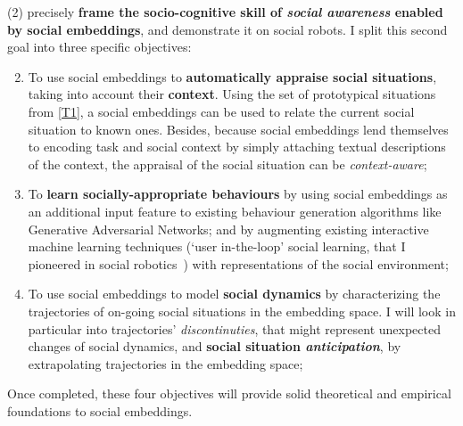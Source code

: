 \vspace{1em}
\noindent(2) precisely \textbf{frame the socio-cognitive skill of \emph{social awareness} enabled
by social embeddings}, and demonstrate it on social robots. I split this second
goal into three specific objectives:



\begin{enumerate}[label=\textbf{O\arabic*}]
    \setcounter{enumi}{1}
    \item \label{T5} To use social embeddings to \textbf{automatically appraise
        social situations}, taking into account their \textbf{context}. Using
        the set of prototypical situations from \ref{T1}, a social embeddings
        can be used to relate the current social situation to known ones.
        Besides, because social embeddings lend themselves to encoding task and
        social context by simply attaching textual descriptions of the context,
        the appraisal of the social situation can be \emph{context-aware};


    \item \label{T4} To \textbf{learn socially-appropriate behaviours} by using
        social embeddings as an additional input feature to existing behaviour
        generation algorithms like Generative Adversarial
        Networks; and by augmenting existing interactive machine
        learning techniques (`user in-the-loop' social learning, that I
        pioneered in social robotics~\cite{senft2017supervised,
        winkle2020couch,winkle2021leador}) with representations of the social
        environment;

    \item \label{T2} To use social embeddings to model \textbf{social dynamics}
        by characterizing the trajectories of on-going social situations in the
        embedding space. I will look in particular into trajectories'
        \emph{discontinuties}, that might represent unexpected changes of social
        dynamics, and \textbf{social situation \emph{anticipation}}, by
        extrapolating trajectories in the embedding space;

\end{enumerate}

Once completed, these four objectives will provide solid theoretical and
empirical foundations to social embeddings.

